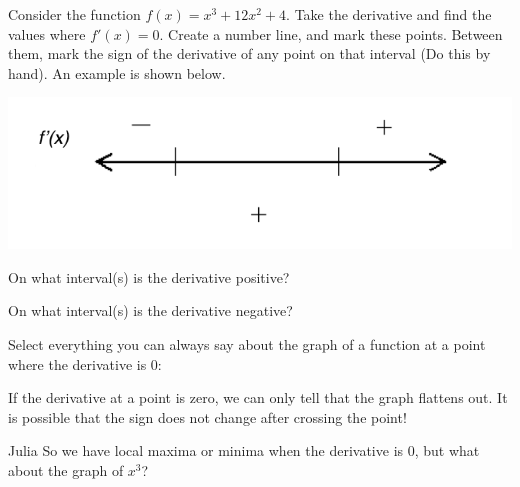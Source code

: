 \documentclass{ximera}
\begin{document}
\begin{question}
Consider the function $f(x)=x^3+12x^2+4$.
Take the derivative and find the values where $f'(x)=0$. Create a number line, and mark these points. Between them, mark the sign of the derivative of any point on that interval (Do this by hand). An example is shown below.

\begin{image}
\includegraphics{ExampleNumberline}
\end{image}

On what interval(s) is the derivative positive?

\begin{selectAll}
\choice{$[-8, 0)$}
\choice{$(-\infty, 0]$}
\end{selectAll}

On what interval(s) is the derivative negative?

\begin{selectAll}
\choice{$[-4, \infty)$}
\choice{$(-\infty, 0]$}
\end{selectAll}

Select everything you can always say about the graph of a function at a point where the derivative is 0:

\begin{selectAll}
\end{selectAll}
\begin{feedback}[correct]
If the derivative at a point is zero, we can only tell that the graph flattens out. It is possible that the sign does not change after crossing the point!
\end{feedback}
\end{question}

\begin{dialogue}
\item[Julia] So we have local maxima or minima when the derivative is 0, but what about the graph of $x^3$?
\end{dialogue}
\end{document}
